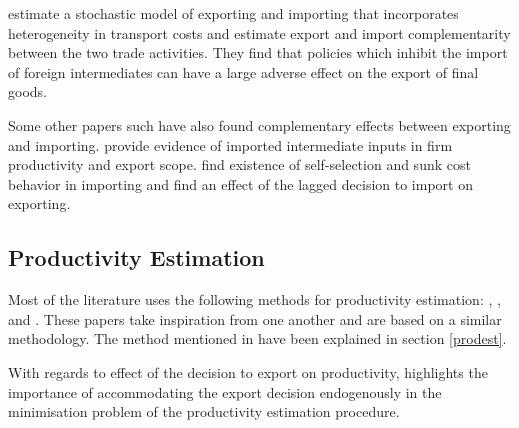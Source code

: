 \documentclass[12pt]{article}
\begin{document}
\textcite{kasahara2013productivity} estimate a stochastic model of
exporting and importing that incorporates heterogeneity in transport
costs and estimate export and import complementarity between the two
trade activities. They find that policies which inhibit the
import of  foreign intermediates can have a large adverse 
effect on the export of final goods.  

Some other papers such have also found complementary effects between
exporting and importing. \textcite{vogel2010higher} provide evidence of imported
intermediate inputs in firm productivity and export scope. 
 \textcite{muuls2009imports} find
existence of self-selection and sunk cost behavior in importing and
find an effect of the lagged decision to import on exporting. 


\subsection*{Productivity Estimation}
Most of the literature uses
the following methods for productivity estimation: 
\textcite{olley1992dynamics}, \textcite{levinsohn2003estimating},
\textcite{ackerberg2006structural} and \textcite{wooldridge2009estimating}. 
These papers take inspiration from one another and are based on a
similar methodology. The method
mentioned in \textcite{olley1992dynamics}
have been explained in section \ref{prodest}.

With regards to effect of the decision to export on productivity, \textcite{de2013detecting} highlights the importance of accommodating
the export decision endogenously in the minimisation problem of the productivity
estimation procedure.
\end{document}
